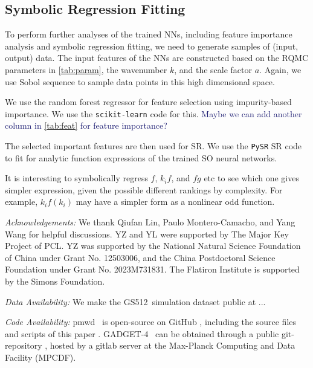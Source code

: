 \documentclass[modern, trackchanges, dvipsnames]{aastex631}
\newcommand{\pmwd}{{\usefont{T1}{nova}{m}{sl}pmwd}}
\newcommand{\GADGET}{{{\fontsize{10pt}{12pt}\selectfont GADGET}-4}}
\newcommand{\GSDATA}{{GS512}}
\newcommand{\YL}[1]{\textcolor{Bittersweet}{#1}}
\newcommand{\YZ}[1]{\textcolor{MidnightBlue}{#1}}
\begin{document}
\vspace{1em}
\subsection{Symbolic Regression Fitting}

To perform further analyses of the trained NNs, including feature
importance analysis and symbolic regression fitting, we need to generate
samples of (input, output) data.
The input features of the NNs are constructed based on the RQMC
parameters in \autoref{tab:param}, the wavenumber $k$, and the scale
factor $a$.
Again, we use Sobol sequence to sample data points in this high
dimensional space.

We use the random forest regressor for feature selection using
impurity-based importance.
We use the \texttt{scikit-learn} \citep{scikit-learn} code for this.
\YZ{Maybe we can add another column in \autoref{tab:feat} for feature
importance?}

The selected important features are then used for SR.
We use the \texttt{PySR} \citep{PySR} SR code to fit for analytic
function expressions of the trained SO neural networks.

\YL{It is interesting to symbolically regress $f$, $k_i f$, and $f g$
etc to see which one gives simpler expression, given the possible
different rankings by complexity.
For example, $k_i f(k_i)$ may have a simpler form as a nonlinear odd
function.}


\vspace{1em}
\textit{\large Acknowledgements:}
We thank Qiufan Lin, Paulo Montero-Camacho, and Yang Wang for helpful
discussions.
YZ and YL were supported by The Major Key Project of PCL.
YZ was supported by the National Natural Science Foundation of China
under Grant No. 12503006, and the China Postdoctoral Science Foundation
under Grant No. 2023M731831.
The Flatiron Institute is supported by the Simons Foundation.


\vspace{1em}
\textit{\large Data Availability:}
We make the \GSDATA\ simulation dataset public at ...


\vspace{1em}
\textit{\large Code Availability:}
\pmwd\ \citep{Li2022b} is open-source on GitHub
\href{https://github.com/eelregit/pmwd}{\faGithub}, including the source
files and scripts of this paper
\href{https://github.com/eelregit/pmwd/tree/master/docs/papers/sto}{\faFile}.
\GADGET\ \citep{GADGET-4} can be obtained through a public
git-repository \href{http://gitlab.mpcdf.mpg.de/vrs/gadget4}{\faGitlab},
hosted by a gitlab server at the Max-Planck Computing and Data Facility
(MPCDF).
\end{document}
